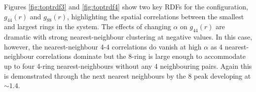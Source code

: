 Figures \ref{fig:toptrdf3} and \ref{fig:toptrdf4} show two key RDFs for the \zach{} configuration, $g_{44}\left(r\right)$ and $g_{88}\left(r\right)$, highlighting the spatial correlations between the smallest and largest rings in the system. 
The effects of changing $\alpha$ on $g_{44}\left(r\right)$ are dramatic with strong nearest\--neighbour clustering at negative values. 
In this case, however, the nearest-neighbour 4-4 correlations do vanish at high $\alpha$ as 4 nearest\--neighbour correlations dominate but the 8\--ring is large enough to accommodate up to four 4\--ring nearest\--neighbours without any 4 neighbouring pairs. 
Again this is demonstrated through the next nearest neighbours by the 8 peak developing at $\sim 1.4$.

\begin{figure}[bt]
     \centering
     

\end{figure}
